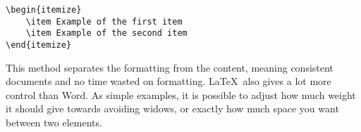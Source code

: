 \begin{lstlisting}
\begin{itemize}
	\item Example of the first item
	\item Example of the second item
\end{itemize}
\end{lstlisting}

This method separates the formatting from the content, meaning consistent documents and no time wasted on formatting. \LaTeX\ also gives a lot more control than Word. As simple examples, it is possible to adjust how much weight it should give towards avoiding widows, or exactly how much space you want between two elements.